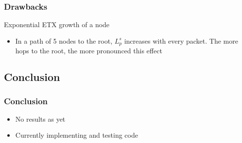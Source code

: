 \documentclass{beamer}
\begin{document}
\begin{frame}
  \frametitle{Drawbacks}
    Exponential ETX growth of a node
  \begin{itemize}
    \item In a path of 5 nodes to the root, $L_p^s$ increases with every packet.
    The more hops to the root, the more pronounced this effect
  \end{itemize}
\end{frame}  

\subsection{Conclusion}

\begin{frame}
  \frametitle{Conclusion}
  \begin{itemize}
    \item No results as yet
    \item Currently implementing and testing code
  \end{itemize}
\end{frame}  
\end{document}
